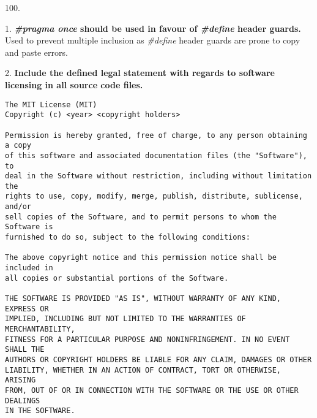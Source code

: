 \begin{labeling}{100.}
\item [1.] \textbf{\textit{\#pragma once} should be used in favour of \textit{\#define} header guards.} \\
   Used to prevent multiple inclusion as \textit{\#define} header guards are prone to copy and paste errors. \\
\item [2.] \textbf{Include the defined legal statement with regards to software licensing in all source code files.} \\
   \begin{verbatim}
The MIT License (MIT)
Copyright (c) <year> <copyright holders>

Permission is hereby granted, free of charge, to any person obtaining a copy 
of this software and associated documentation files (the "Software"), to 
deal in the Software without restriction, including without limitation the 
rights to use, copy, modify, merge, publish, distribute, sublicense, and/or 
sell copies of the Software, and to permit persons to whom the Software is 
furnished to do so, subject to the following conditions:

The above copyright notice and this permission notice shall be included in 
all copies or substantial portions of the Software.

THE SOFTWARE IS PROVIDED "AS IS", WITHOUT WARRANTY OF ANY KIND, EXPRESS OR 
IMPLIED, INCLUDING BUT NOT LIMITED TO THE WARRANTIES OF MERCHANTABILITY, 
FITNESS FOR A PARTICULAR PURPOSE AND NONINFRINGEMENT. IN NO EVENT SHALL THE 
AUTHORS OR COPYRIGHT HOLDERS BE LIABLE FOR ANY CLAIM, DAMAGES OR OTHER 
LIABILITY, WHETHER IN AN ACTION OF CONTRACT, TORT OR OTHERWISE, ARISING 
FROM, OUT OF OR IN CONNECTION WITH THE SOFTWARE OR THE USE OR OTHER DEALINGS 
IN THE SOFTWARE.


\end{verbatim}
\end{labeling}
